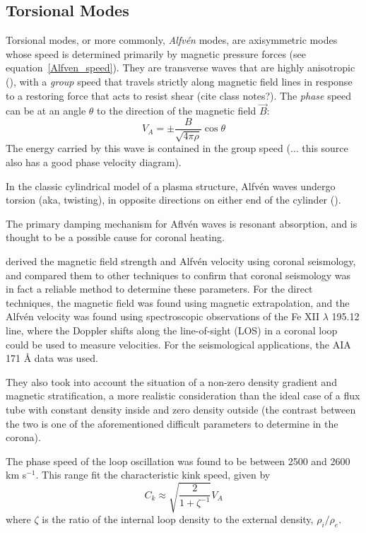 \documentclass[preprint2]{aastex}
\begin{document}
\subsection{Torsional Modes}
Torsional modes, or more commonly, \emph{Alfv\'en} modes, are axisymmetric
modes whose speed is determined primarily by magnetic pressure forces
(see equation~\ref{Alfven_speed}).
They are transverse waves that are highly anisotropic (\cite{Goossens}),
with a \emph{group} speed that
travels strictly along magnetic field lines in response
to a restoring force that acts to resist shear (cite class notes?).
The \emph{phase} speed can be at an angle $\theta$ to the direction
of the magnetic field $\vec{B}$:
\begin{equation}
    V_A = \pm \frac{B}{\sqrt{4\pi\rho}}\cos\theta
\end{equation}
The energy carried by this wave is contained in the group speed
(\cite{Somov}$\ldots$ this source also has a good phase velocity
diagram).

In the classic cylindrical model of a plasma structure,
Alfv\'en waves undergo torsion (aka, twisting), in opposite directions on
either end of the cylinder (\cite{Nak}).

The primary damping mechanism for Aflv\'en waves is resonant absorption,
and is thought to be a possible cause for coronal heating.

\cite{tor_1} derived the magnetic field strength and Alfv\'en velocity
using coronal seismology, and compared them to other techniques to
confirm that coronal seismology was in fact a reliable method to determine
these parameters. For the direct techniques,
the magnetic field was found using magnetic extrapolation,
and the Alfv\'en velocity was found
using spectroscopic observations of the Fe
{\footnotesize XII} $\lambda$ 195.12 line, where the Doppler shifts
along the line-of-sight (LOS) in a coronal loop could be used to
measure velocities. For the seismological applications, the AIA
171 \AA{} data was used.

They also took into account the situation of a non-zero density
gradient and magnetic stratification, a more realistic consideration
than the ideal case of a flux tube with constant density inside
and zero density outside (the contrast between the two is one of
the aforementioned difficult parameters to determine in the corona).

The phase speed of the loop oscillation was found to be between
2500 and 2600 km s$^{-1}$. This range fit the characteristic kink
speed, given by
\begin{equation}\label{kink_speed}
    C_k \approx \sqrt{\frac{2}{1+\zeta^{-1}}}V_A
\end{equation}
where $\zeta$ is the ratio of the internal loop density to the external
density, $\rho_i/\rho_e$.
\end{document}
